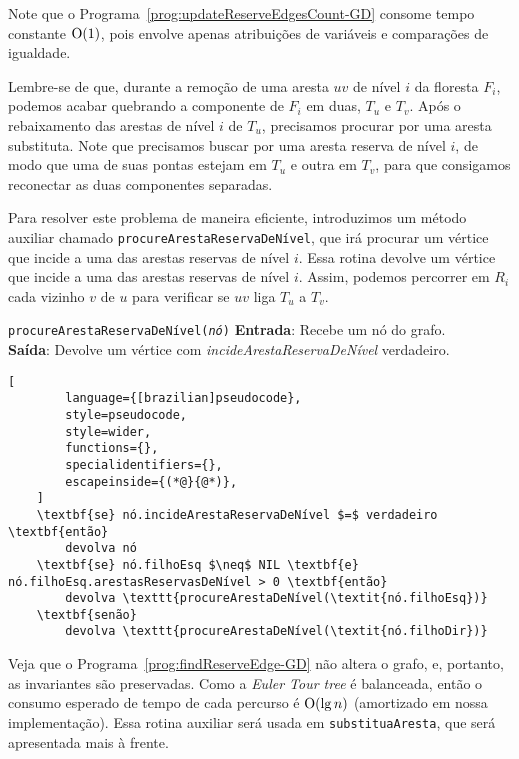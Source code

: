 Note que o Programa~\ref{prog:updateReserveEdgesCount-GD} consome tempo constante $\mathrm{O}(1)$, pois envolve apenas atribuições de variáveis e comparações de igualdade.


Lembre-se de que, durante a remoção de uma aresta $uv$ de nível $i$ da floresta $F_i$, podemos acabar quebrando a componente de $F_i$ em duas, $T_u$ e $T_v$. Após o rebaixamento das arestas de nível $i$ de $T_u$, precisamos procurar por uma aresta substituta. Note que precisamos buscar por uma aresta reserva de nível $i$, de modo que uma de suas pontas estejam em $T_u$ e outra em $T_v$, para que consigamos reconectar as duas componentes separadas. 

Para resolver este problema de maneira eficiente, introduzimos um método auxiliar chamado \texttt{procureArestaReservaDeNível}, que irá procurar um vértice que incide a uma das arestas reservas de nível $i$.
Essa rotina devolve um vértice que incide a uma das arestas reservas de nível $i$. Assim, podemos percorrer em $R_i$ cada vizinho $v$ de $u$ para verificar se $uv$ liga $T_u$ a $T_v$. 

\begin{programruledcaption}{\texttt{procureArestaReservaDeNível(\textit{nó})} \label{prog:findReserveEdge-GD}}
    \noindent\textbf{Entrada}: Recebe um nó do grafo.
    \\
    \noindent\textbf{Saída}: Devolve um vértice com \textit{incideArestaReservaDeNível} verdadeiro.
    \vspace{-0.5\baselineskip}
    \begin{lstlisting}[
        language={[brazilian]pseudocode},
        style=pseudocode,
        style=wider,
        functions={},
        specialidentifiers={},
        escapeinside={(*@}{@*)},
    ]
    \textbf{se} nó.incideArestaReservaDeNível $=$ verdadeiro \textbf{então}
        devolva nó
    \textbf{se} nó.filhoEsq $\neq$ NIL \textbf{e} nó.filhoEsq.arestasReservasDeNível > 0 \textbf{então}
        devolva \texttt{procureArestaDeNível(\textit{nó.filhoEsq})}
    \textbf{senão}
        devolva \texttt{procureArestaDeNível(\textit{nó.filhoDir})}
\end{lstlisting}
\vspace{-0.5\baselineskip}
\end{programruledcaption}

Veja que o Programa~\ref{prog:findReserveEdge-GD} não altera o grafo, e, portanto, as invariantes são preservadas. Como a \textit{Euler Tour tree} é balanceada, então o consumo esperado de tempo de cada percurso é $\mathrm{O}(\lg n)$ (amortizado em nossa implementação). Essa rotina auxiliar será usada em \texttt{substituaAresta}, que será apresentada mais à frente.

